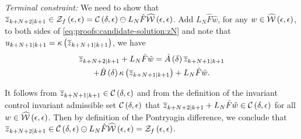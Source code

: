 \noindent\textit{Terminal constraint:}
%
We need to show that $\overline{z}_{k+N+2| k+1}\in\mathcal{Z}_{f}\left(\epsilon,\epsilon\right)=\mathcal{C}\left(\delta,\epsilon\right)\ominus L_{N}\hat{F}\widehat{\mathcal{W}}\left(\epsilon,\epsilon\right)$.
Add $L_{N}\hat{F}\hat{w}$, for any $w\in\widehat{\mathcal{W}}\left(\epsilon,\epsilon\right)$,
to both sides of \eqref{eq:proofs:candidate-solution:zN} and note that
$u_{k+N+1| k+1}=\kappa\left(\overline{z}_{k+N+1| k+1}\right)$,
we have 
\begin{multline*}
  \overline{z}_{k+N+2|
    k+1}+L_{N}\hat{F}\hat{w}=\hat{A}\left(\delta\right)\overline{z}_{k+N+1| k+1} \\
  +\hat{B}\left(\delta\right)\kappa\left(\overline{z}_{k+N+1| k+1}\right)+L_{N}\hat{F}\hat{w}\text{.}
\end{multline*}


 It follows from $\overline{z}_{k+N+1| k+1}\in\mathcal{C}\left(\delta,\epsilon\right)$
and from the definition of the invariant control invariant admissible
set $\mathcal{C}\left(\delta,\epsilon\right)$ 
that $\overline{z}_{k+N+2| k+1}+L_{N}\hat{F}\hat{w}\in\mathcal{C}\left(\delta,\epsilon\right)$
for all $w\in\widehat{\mathcal{W}}\left(\epsilon,\epsilon\right)$. Then by definition
of the Pontryagin difference, we conclude that $\overline{z}_{k+N+2| k+1}\in\mathcal{C}\left(\delta,\epsilon\right)\ominus L_{N}\hat{F}\widehat{\mathcal{W}}\left(\epsilon,\epsilon\right)=\mathcal{Z}_{f}\left(\epsilon,\epsilon\right)$.


